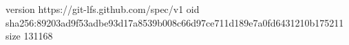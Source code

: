 version https://git-lfs.github.com/spec/v1
oid sha256:89203ad9f53adbe93d17a8539b008c66d97ce711d189e7a0fd6431210b175211
size 131168
